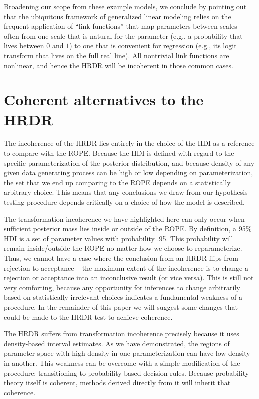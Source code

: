 \documentclass[9pt,twocolumn,twoside]{cidlab-draft}\templatetype{cidlab-invited}
\newcommand{\hdr}{HRDR}
\begin{document}
Broadening our scope from these example models, we conclude by pointing out that the ubiquitous framework of generalized linear modeling relies on the frequent application of ``link functions'' that map parameters between scales -- often from one scale that is natural for the parameter (e.g., a probability that lives between $0$ and $1$) to one that is convenient for regression (e.g., its logit transform that lives on the full real line).  All nontrivial link functions are nonlinear, and hence the \hdr{} will be incoherent in those common cases.

\section*{Coherent alternatives to the \hdr{}}

The incoherence of the \hdr{} lies entirely in the choice of the HDI as a reference to compare with the ROPE. Because the HDI is defined with regard to the specific parameterization of the posterior distribution, and because density of any given data generating process can be high or low depending on parameterization, the set that we end up comparing to the ROPE depends on a statistically arbitrary choice. This means that any conclusions we draw from our hypothesis testing procedure depends critically on a choice of how the model is described. 

The transformation incoherence we have highlighted here can only occur when sufficient posterior mass lies inside or outside of the ROPE. By definition, a 95\% HDI is a set of parameter values with probability .95. This probability will remain inside/outside the ROPE no matter how we choose to reparameterize. Thus, we cannot have a case where the conclusion from an \hdr{} flips from rejection to acceptance -- the maximum extent of the incoherence is to change a rejection or acceptance into an inconclusive result (or vice versa). This is still not very comforting, because any opportunity for inferences to change arbitrarily based on statistically irrelevant choices indicates a fundamental weakness of a procedure. In the remainder of this paper we will suggest some changes that could be made to the \hdr{} test to achieve coherence.

The \hdr{} suffers from transformation incoherence precisely because it uses density-based interval estimates. As we have demonstrated, the regions of parameter space with high density in one parameterization can have low density in another. This weakness can be overcome with a simple modification of the procedure: transitioning to probability-based decision rules. Because probability theory itself is coherent, methods derived directly from it will inherit that coherence. 
\end{document}
